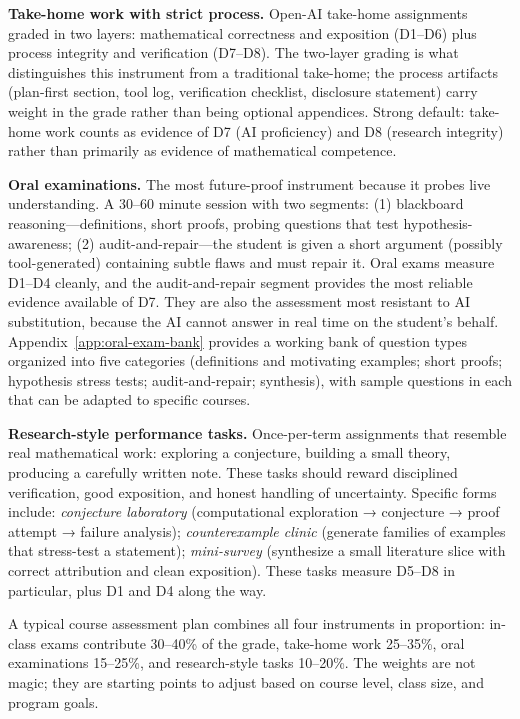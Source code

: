 \documentclass[11pt]{book}
\begin{document}
\textbf{Take-home work with strict process.} Open-AI take-home assignments graded in two layers: mathematical correctness and exposition (D1--D6) plus process integrity and verification (D7--D8). The two-layer grading is what distinguishes this instrument from a traditional take-home; the process artifacts (plan-first section, tool log, verification checklist, disclosure statement) carry weight in the grade rather than being optional appendices. Strong default: take-home work counts as evidence of D7 (AI proficiency) and D8 (research integrity) rather than primarily as evidence of mathematical competence.

\textbf{Oral examinations.} The most future-proof instrument because it probes live understanding. A 30--60 minute session with two segments: (1) blackboard reasoning---definitions, short proofs, probing questions that test hypothesis-awareness; (2) audit-and-repair---the student is given a short argument (possibly tool-generated) containing subtle flaws and must repair it. Oral exams measure D1--D4 cleanly, and the audit-and-repair segment provides the most reliable evidence available of D7. They are also the assessment most resistant to AI substitution, because the AI cannot answer in real time on the student's behalf. Appendix~\ref{app:oral-exam-bank} provides a working bank of question types organized into five categories (definitions and motivating examples; short proofs; hypothesis stress tests; audit-and-repair; synthesis), with sample questions in each that can be adapted to specific courses.

\textbf{Research-style performance tasks.} Once-per-term assignments that resemble real mathematical work: exploring a conjecture, building a small theory, producing a carefully written note. These tasks should reward disciplined verification, good exposition, and honest handling of uncertainty. Specific forms include: \emph{conjecture laboratory} (computational exploration → conjecture → proof attempt → failure analysis); \emph{counterexample clinic} (generate families of examples that stress-test a statement); \emph{mini-survey} (synthesize a small literature slice with correct attribution and clean exposition). These tasks measure D5--D8 in particular, plus D1 and D4 along the way.

A typical course assessment plan combines all four instruments in proportion: in-class exams contribute 30--40\% of the grade, take-home work 25--35\%, oral examinations 15--25\%, and research-style tasks 10--20\%. The weights are not magic; they are starting points to adjust based on course level, class size, and program goals.
\end{document}
